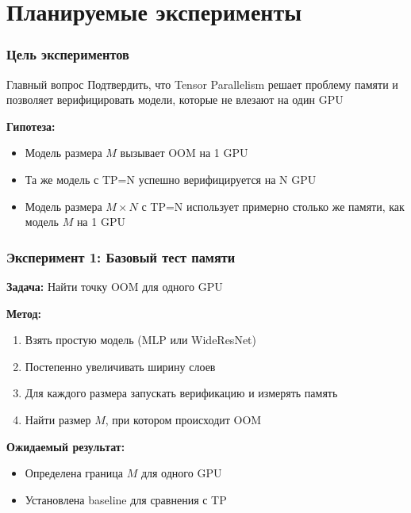 
\section{Планируемые эксперименты}

\begin{frame}
\frametitle{Цель экспериментов}

\begin{block}{Главный вопрос}
Подтвердить, что Tensor Parallelism решает проблему памяти и позволяет верифицировать модели, которые не влезают на один GPU
\end{block}

\vspace{0.5cm}

\textbf{Гипотеза:}
\begin{itemize}
    \item Модель размера $M$ вызывает OOM на 1 GPU
    \item Та же модель с TP=N успешно верифицируется на N GPU
    \item Модель размера $M \times N$ с TP=N использует примерно столько же памяти, как модель $M$ на 1 GPU
\end{itemize}

\end{frame}

\begin{frame}
\frametitle{Эксперимент 1: Базовый тест памяти}

\textbf{Задача:} Найти точку OOM для одного GPU

\vspace{0.3cm}

\textbf{Метод:}
\begin{enumerate}
    \item Взять простую модель (MLP или WideResNet)
    \item Постепенно увеличивать ширину слоев
    \item Для каждого размера запускать верификацию и измерять память
    \item Найти размер $M$, при котором происходит OOM
\end{enumerate}

\vspace{0.3cm}

\textbf{Ожидаемый результат:}
\begin{itemize}
    \item Определена граница $M$ для одного GPU
    \item Установлена baseline для сравнения с TP
\end{itemize}

\end{frame}

